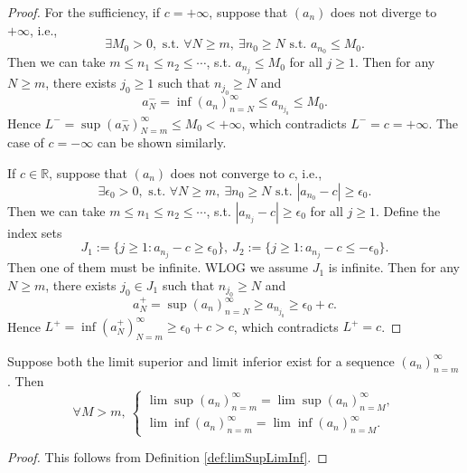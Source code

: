 \begin{proof}
  For the sufficiency, 
  if $c=+\infty$,
  suppose that $(a_{n})$ does not diverge to $+\infty$, i.e.,
  \begin{displaymath}
    \exists M_{0}>0, \text{ s.t. } \forall N\ge m,\
    \exists n_{0}\ge N \text{ s.t. } a_{n_{0}}\le M_{0}.
  \end{displaymath}
  Then we can take $m\le n_{1}\le n_{2}\le \cdots$, s.t. 
  $a_{n_{j}}\le M_{0}$ for all $j\ge 1$.
  Then for any $N\ge m$, there exists $j_{0}\ge 1$ such that
  $n_{j_{0}}\ge N$ and 
  \begin{displaymath}
    a_{N}^{-}=\inf(a_{n})_{n=N}^{\infty}\le a_{n_{j_{0}}}\le M_{0}.
  \end{displaymath}
  Hence $L^{-}=\sup(a_{N}^{-})_{N=m}^{\infty}\le M_{0}<+\infty$,
  which contradicts $L^{-}=c=+\infty$.
  The case of $c=-\infty$ can be shown similarly.

  If $c\in \mathbb{R}$,
  suppose that $(a_{n})$ does not converge to $c$, i.e.,
  \begin{displaymath}
    \exists \epsilon_{0}>0, \text{ s.t. } \forall N\ge m,\ 
    \exists n_{0}\ge N \text{ s.t. } |a_{n_{0}}-c|\ge \epsilon_{0}.
  \end{displaymath}
  Then we can take $m\le n_{1}\le n_{2}\le \cdots$, s.t.
  $|a_{n_{j}}-c|\ge \epsilon_{0}$ for all $j\ge 1$.
  Define the index sets
  \begin{displaymath}
    J_{1}:=\{j\ge 1:a_{n_{j}}-c\ge \epsilon_{0}\},\
    J_{2}:=\{j\ge 1:a_{n_{j}}-c\le -\epsilon_{0}\}.
  \end{displaymath}
  Then one of them must be infinite.
  WLOG we assume $J_{1}$ is infinite. Then for any $N\ge m$,
  there exists $j_{0}\in J_{1}$ such that $n_{j_{0}}\ge N$ and 
  \begin{displaymath}
    a_{N}^{+}=\sup(a_{n})_{n=N}^{\infty}
    \ge a_{n_{j_{0}}}\ge \epsilon_{0}+c.
  \end{displaymath}
  Hence $L^{+}=\inf(a_{N}^{+})_{N=m}^{\infty}\ge \epsilon_{0}+c>c$, 
  which contradicts $L^{+}=c$.
\end{proof}

\begin{lem}
  \label{lem:limSupLimInfIndependenceOnStartingIndices}
  Suppose both the limit superior and limit inferior
  exist for a sequence $(a_n)_{n=m}^{\infty}$.
  Then 
  \begin{equation}
    \label{eq:limSupLimInfIndependenceOnStartingIndices}
    \forall M>m,\
    \left\{
      \begin{array}{l}
        \lim\sup (a_n)_{n=m}^{\infty}
        = \lim\sup (a_n)_{n=M}^{\infty},\\
        \lim\inf (a_n)_{n=m}^{\infty}
        = \lim\inf (a_n)_{n=M}^{\infty}.
      \end{array}\right.
  \end{equation}
\end{lem}
\begin{proof}
  This follows from Definition \ref{def:limSupLimInf}. 
\end{proof}

